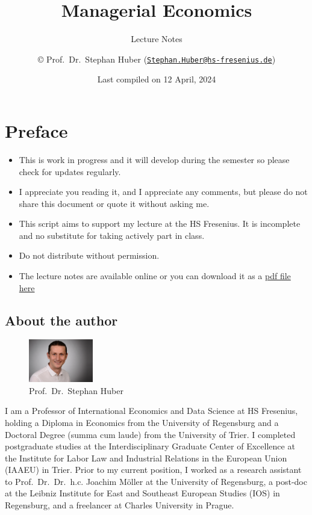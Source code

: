 \documentclass[
  12pt,
  oneside]{book}
\title{Managerial Economics}
\subtitle{Lecture Notes}
\author{© Prof.~Dr.~Stephan Huber (\href{mailto:Stephan.Huber@hs-fresenius.de}{\nolinkurl{Stephan.Huber@hs-fresenius.de}})}
\date{Last compiled on 12 April, 2024}
\providecommand{\tightlist}{%
  \setlength{\itemsep}{0pt}\setlength{\parskip}{0pt}}
\theoremstyle{definition}
\theoremstyle{definition}
\theoremstyle{definition}
\theoremstyle{definition}
\theoremstyle{remark}
\begin{document}
\maketitle

{
\hypersetup{linkcolor=}
\setcounter{tocdepth}{2}
\tableofcontents
}
\hypertarget{preface}{%
\chapter*{Preface}\label{preface}}

\begin{itemize}
\tightlist
\item
  This is work in progress and it will develop during the semester so please check for updates regularly.
\item
  I appreciate you reading it, and I appreciate any comments, but please do not share this document or quote it without asking me.
\item
  This script aims to support my lecture at the HS Fresenius. It is incomplete and no substitute
  for taking actively part in class.
\item
  Do not distribute without permission.
\item
  The lecture notes are available online or you can download it as a \href{https://raw.githubusercontent.com/hubchev/hubchev.github.io/main/me/_main.pdf}{pdf file here}
\end{itemize}

\hypertarget{about-the-author}{%
\section*{About the author}\label{about-the-author}}

\begin{figure}
\centering
\includegraphics[width=0.25\textwidth,height=\textheight]{fig/huber2.jpeg}
\caption[\label{fig:itsme} Prof.~Dr.~Stephan Huber]{\label{fig:itsme} Prof.~Dr.~Stephan Huber\footnotemark{}}
\end{figure}

I am a Professor of International Economics and Data Science at HS Fresenius, holding a Diploma in Economics from the University of Regensburg and a Doctoral Degree (summa cum laude) from the University of Trier. I completed postgraduate studies at the Interdisciplinary Graduate Center of Excellence at the Institute for Labor Law and Industrial Relations in the European Union (IAAEU) in Trier. Prior to my current position, I worked as a research assistant to Prof.~Dr.~Dr.~h.c. Joachim Möller at the University of Regensburg, a post-doc at the Leibniz Institute for East and Southeast European Studies (IOS) in Regensburg, and a freelancer at Charles University in Prague.
\end{document}
